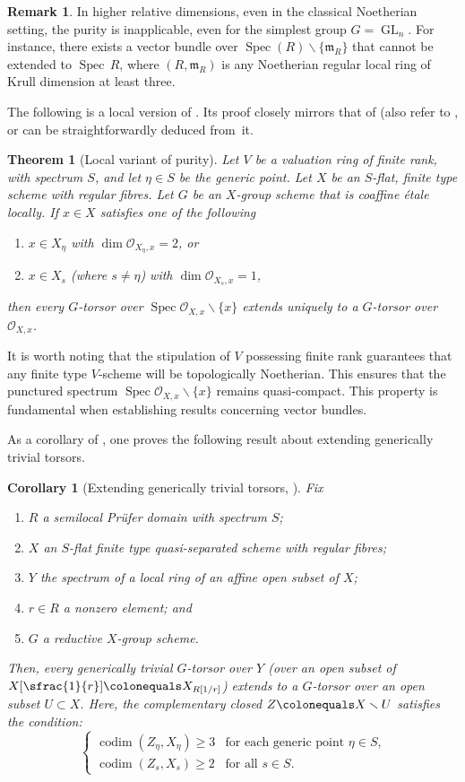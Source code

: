 \documentclass[JEP,XML,SOM,Unicode,published]{cedram}
\newenvironment{enumeratei}
{\bgroup\def\theenumi{\roman{enumi}}\def\theenumii{\arabic{enumii}}\begin{enumerate}}
{\end{enumerate}\egroup}
\let\backslash\smallsetminus
\newcommand{\sO}{\mathscr{O}}
\let\ce\colonequals
\DeclareMathOperator{\Spec}{Spec}
\DeclareMathOperator{\GL}{GL}
\DeclareMathOperator{\codim}{codim}
\newcommand{\bthm}{\begin{thm}}
\newcommand{\ethm}{\end{thm}}
\newcommand{\bcor}{\begin{cor}}
\newcommand{\ecor}{\end{cor}}
\newcommand{\brem}{\begin{rem}}
\newcommand{\erem}{\end{rem}}
\newcommand{\benumr}{\begin{enumeratei}}
\newcommand{\eenumr}{\end{enumeratei}}
\theoremstyle{plain}
\newtheorem{thm}[subsection]{Theorem}
\newtheorem{cor}[subsection]{Corollary}
\theoremstyle{definition}
\newtheorem{rem}[subsection]{Remark}
\begin{document}
\brem \label{rem on purity fo rel curves}
In higher relative dimensions, even in the classical Noetherian setting, the purity  is inapplicable, even for the simplest group $G=\GL_{n}$. For instance, there exists a vector bundle over $\Spec(R)\backslash \{\mathfrak{m}_R\}$ that cannot be extended to $\Spec\, R$, where $(R,\mathfrak{m}_R)$ is any Noetherian regular local ring of Krull dimension at least three.
\erem

The following is a local version of .
{Its proof closely mirrors that of  (also refer to \cite[Th.\,2.8]{GL23}, or can be straightforwardly deduced from~it.}

\bthm[Local variant of purity] \label{extends across codim-2 points}
Let $V$ be a valuation ring of finite rank, with spectrum $S$, and {let $\eta\in S$ be the generic point}.
Let $X$ be an $S$-flat, finite type scheme with regular fibres. Let $G$ be an $X$-group scheme that is coaffine étale locally. If $x\in X$ satisfies one of the following
\benumr
\item\label{g-tor-local-gen} $x\in X_{\eta}$ with $\dim \sO_{X_{\eta},x} =2$, or
\item\label{g-tor-local-ngen} $x\in X_s$ (where $s \neq \eta$) with $\dim \sO_{X_s,x} =1$,
\eenumr
\noindent
then every $G$-torsor over $\Spec \sO_{X,x} \backslash \{x\}$ extends uniquely to a $G$-torsor over $ \sO_{X,x}$.
\ethm
It is worth noting that the stipulation of $V$ possessing finite rank guarantees that any finite type $V$-scheme will be topologically Noetherian. This ensures that the punctured spectrum $\Spec \sO_{X,x} \backslash \{x\}$ remains quasi-compact. This property is fundamental when establishing results concerning vector bundles.

As a corollary of , one proves the following result about extending generically trivial torsors.

\bcor [Extending generically trivial torsors, {\cite[Cor.\,2.10]{GL23}}]\label{extend generically trivial torsors}
Fix
\benumr
\item $R$ a semilocal Prüfer domain with spectrum $S$;
\item $X$ an $S$-flat finite type quasi-separated scheme with regular fibres;
\item $Y$ the spectrum of a local ring of an affine open subset of $X$;
\item $r\in R$ a nonzero element; and
\item $G$ a reductive $X$-group scheme.
\eenumr
\noindent
Then, every generically trivial $G$-torsor over $Y$ (\resp over an open subset of $X[\sfrac{1}{r}]\ce X_{R[1/r]}$) extends to a $G$-torsor over an open subset $U\subset X$. Here, the complementary closed $Z\ce X\backslash U$ satisfies the condition:
\[
\begin{cases}
\codim(Z_{\eta}, X_{\eta})\geq 3 & \text{for each generic point $\eta\in S$,} \\
\codim(Z_s,X_s)\geq 2 & \text{for all $s\in S$.}
\end{cases}
\]
\ecor
\end{document}
